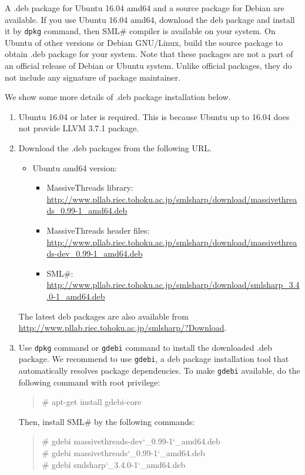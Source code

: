\documentclass{jbook}
\newcommand{\smlsharp}{SML\#}
\newcommand{\version}{3.4.0}
\newcommand\eurl[1]{{\edef\eurlTMP{{#1}}\expandafter\url\eurlTMP}}
\newenvironment{program}{\begin{quote}\begin{tt}}%
                        {\end{tt}\end{quote}}
\begin{document}
\else%

	A \mbox{.deb} package for Ubuntu 16.04 amd64 and
a source package for Debian are available.
	If you use Ubuntu 16.04 amd64, download the \mbox{deb} package
and install it by {\tt dpkg} command, then 
\smlsharp{} compiler is available on your system.
	On Ubuntu of other versions or Debian GNU/Linux, build the
source package to obtain \mbox{.deb} package for your system.
	Note that these packages are not a part of an official
release of Debian or Ubuntu system.
	Unlike official packages, they do not include any signature of
package maintainer.

	We show some more details of \mbox{.deb} package installation
below.

\begin{enumerate}
\item Ubuntu 16.04 or later is required.
	This is because Ubuntu up to 16.04 does not provide LLVM 3.7.1
package.
\item Download the \mbox{.deb} packages from the following URL.
\begin{itemize}
\item Ubuntu amd64 version:
\begin{itemize}
\item MassiveThreads library:
\eurl{http://www.pllab.riec.tohoku.ac.jp/smlsharp/download/massivethreads_0.99-1_amd64.deb}
\item MassiveThreads header files:
\eurl{http://www.pllab.riec.tohoku.ac.jp/smlsharp/download/massivethreads-dev_0.99-1_amd64.deb}
\item \smlsharp{}:
\eurl{http://www.pllab.riec.tohoku.ac.jp/smlsharp/download/smlsharp_\version-1_amd64.deb}
\end{itemize}
\end{itemize}
	The latest deb packages are also available from
\url{http://www.pllab.riec.tohoku.ac.jp/smlsharp/?Download}.
\item
	Use {\tt dpkg} command or {\tt gdebi} command to install
the downloaded \mbox{.deb} package.
	We recommend to use {\tt gdebi}, a deb package installation
tool that automatically resolves package dependencies.
	To make {\tt gdebi} available, do the following command with
root privilege:
\begin{program}
\# apt-get install gdebi-core
\end{program}
	Then, install \smlsharp{} by the following commands:
\begin{program}
\# gdebi massivethreads-dev\char`\_0.99-1\char`\_amd64.deb\\
\# gdebi massivethreads\char`\_0.99-1\char`\_amd64.deb\\
\# gdebi smlsharp\char`\_\version{}-1\char`\_amd64.deb
\end{program}


\end{enumerate}
\end{document}
